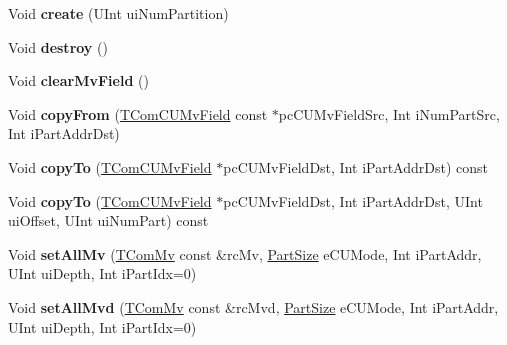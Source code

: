 \begin{DoxyCompactItemize}
\item 
\mbox{\label{class_t_com_c_u_mv_field_a497c34b0ef11d48bad0a83c487cfffdd}} 
Void {\bfseries create} (U\+Int ui\+Num\+Partition)
\item 
\mbox{\label{class_t_com_c_u_mv_field_aabd2ad99ca5944c9d3621ee8cc5fa395}} 
Void {\bfseries destroy} ()
\item 
\mbox{\label{class_t_com_c_u_mv_field_a0b3da499c0b3c59df93113f9218d23c8}} 
Void {\bfseries clear\+Mv\+Field} ()
\item 
\mbox{\label{class_t_com_c_u_mv_field_ad48933c6dc49dd6965416cacba8072c5}} 
Void {\bfseries copy\+From} (\hyperlink{class_t_com_c_u_mv_field}{T\+Com\+C\+U\+Mv\+Field} const $\ast$pc\+C\+U\+Mv\+Field\+Src, Int i\+Num\+Part\+Src, Int i\+Part\+Addr\+Dst)
\item 
\mbox{\label{class_t_com_c_u_mv_field_a89a9a69c77cfb985c0d6f2a79561f2a6}} 
Void {\bfseries copy\+To} (\hyperlink{class_t_com_c_u_mv_field}{T\+Com\+C\+U\+Mv\+Field} $\ast$pc\+C\+U\+Mv\+Field\+Dst, Int i\+Part\+Addr\+Dst) const
\item 
\mbox{\label{class_t_com_c_u_mv_field_a674925fa54f1f8af4532a09ce3dfe24b}} 
Void {\bfseries copy\+To} (\hyperlink{class_t_com_c_u_mv_field}{T\+Com\+C\+U\+Mv\+Field} $\ast$pc\+C\+U\+Mv\+Field\+Dst, Int i\+Part\+Addr\+Dst, U\+Int ui\+Offset, U\+Int ui\+Num\+Part) const
\item 
\mbox{\label{class_t_com_c_u_mv_field_a62d818c35146d83da5ac477e096fbecf}} 
Void {\bfseries set\+All\+Mv} (\hyperlink{class_t_com_mv}{T\+Com\+Mv} const \&rc\+Mv, \hyperlink{_type_def_8h_a0093b7809f3cfae06fda9d67441267bd}{Part\+Size} e\+C\+U\+Mode, Int i\+Part\+Addr, U\+Int ui\+Depth, Int i\+Part\+Idx=0)
\item 
\mbox{\label{class_t_com_c_u_mv_field_a3f177a52af15826620826c67607a1390}} 
Void {\bfseries set\+All\+Mvd} (\hyperlink{class_t_com_mv}{T\+Com\+Mv} const \&rc\+Mvd, \hyperlink{_type_def_8h_a0093b7809f3cfae06fda9d67441267bd}{Part\+Size} e\+C\+U\+Mode, Int i\+Part\+Addr, U\+Int ui\+Depth, Int i\+Part\+Idx=0)

\end{DoxyCompactItemize}
